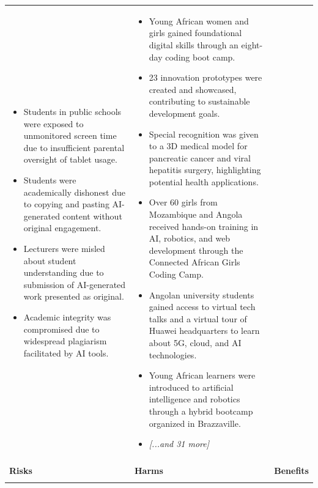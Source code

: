 \begin{longtable}{p{5.2cm}|p{5.2cm}|p{5.2cm}}
\begin{itemize}[leftmargin=*, nosep, before=\vspace{-0.5\baselineskip}, after=\vspace{-0.5\baselineskip}]
\footnotesize
\item Students in public schools were exposed to unmonitored screen time due to insufficient parental oversight of tablet usage.
\item Students were academically dishonest due to copying and pasting AI-generated content without original engagement.
\item Lecturers were misled about student understanding due to submission of AI-generated work presented as original.
\item Academic integrity was compromised due to widespread plagiarism facilitated by AI tools.
\end{itemize} & \begin{itemize}[leftmargin=*, nosep, before=\vspace{-0.5\baselineskip}, after=\vspace{-0.5\baselineskip}] 
\footnotesize
\item Young African women and girls gained foundational digital skills through an eight-day coding boot camp.
\item 23 innovation prototypes were created and showcased, contributing to sustainable development goals.
\item Special recognition was given to a 3D medical model for pancreatic cancer and viral hepatitis surgery, highlighting potential health applications.
\item Over 60 girls from Mozambique and Angola received hands-on training in AI, robotics, and web development through the Connected African Girls Coding Camp.
\item Angolan university students gained access to virtual tech talks and a virtual tour of Huawei headquarters to learn about 5G, cloud, and AI technologies.
\item Young African learners were introduced to artificial intelligence and robotics through a hybrid bootcamp organized in Brazzaville.
\item \textit{[...and 31 more]}
\end{itemize} \\
\pagebreak
\multicolumn{3}{l}{\textbf{\large Finance and Investment} \textit{(N=22 articles)}} \\
\midrule
\textbf{Risks} & \textbf{Harms} & \textbf{Benefits} \\
\midrule
\begin{itemize}[leftmargin=*, nosep, before=\vspace{-0.5\baselineskip}, after=\vspace{-0.5\baselineskip}] 

\end{itemize}
\end{longtable}
